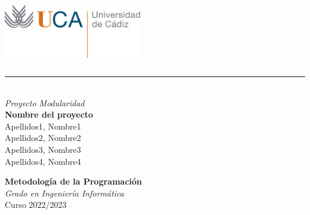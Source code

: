 

\begin{titlepage}

  \includegraphics[width=6cm,height=3cm]{uca}\\
  \rule{1\textwidth}{1pt}\\[0.5cm]

  \noindent
  {\Large\textit{Proyecto Modularidad}}\\[0.6\baselineskip] 
  {\Large\textbf{Nombre del proyecto}}\\[4\baselineskip] 

  \noindent
  {\Large {Apellidos1, Nombre1}}\\[0.3cm]
  {\Large {Apellidos2, Nombre2}}\\[0.3cm]
  {\Large {Apellidos3, Nombre3}}\\[0.3cm]
  {\Large {Apellidos4, Nombre4}}\\[0.3cm]
  
  \vspace{0.2\textheight}

  \noindent
  {\huge\bfseries Metodología de la Programación}\\[1\baselineskip]
  \center
  {\Large\textit{Grado en Ingeniería Informática}}\\[1\baselineskip]
  {\large Curso 2022/2023}\\

\end{titlepage}
